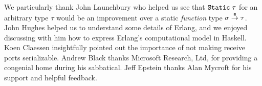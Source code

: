 \documentclass[preprint]{sigplanconf}
\begin{document}
\acks
We particularly thank John Launchbury who helped us see that $\text{\tt Static}\;\tau$ for an arbitrary type $\tau$
would be an improvement over a static \emph{function} type 
$\sigma \stackrel{\texttt{\#}}{\rightarrow} \tau$.  John Hughes helped us to understand some details of Erlang, and we enjoyed discussing with him how to express Erlang's computational model in Haskell. Koen Claessen
insightfully pointed out the importance of not making receive ports serializable.
Andrew Black thanks Microsoft Research, Ltd, for providing a congenial home during his sabbatical.
Jeff Epstein thanks Alan Mycroft for his support and helpful feedback. 





%
%
%
\end{document}
